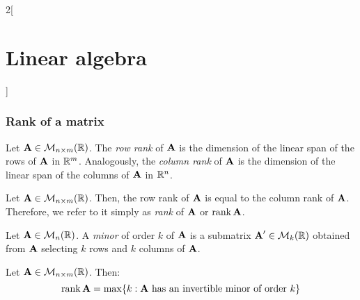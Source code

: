 \documentclass[../../../main_math.tex]{subfiles}
\begin{document}
\begin{multicols}{2}[\section{Linear algebra}]
  \subsubsection{Rank of a matrix}
  \begin{definition}
    Let $\boldsymbol{\mathrm{A}}\in\mathcal{M}_{n\times m}(\mathbb{R})$. The \emph{row rank} of $\boldsymbol{\mathrm{A}}$ is the dimension of the linear span of the rows of $\boldsymbol{\mathrm{A}}$ in $\mathbb{R}^m$. Analogously, the \emph{column rank} of $\boldsymbol{\mathrm{A}}$ is the dimension of the linear span of the columns of $\boldsymbol{\mathrm{A}}$ in $\mathbb{R}^n$.
  \end{definition}
  \begin{proposition}
    Let $\boldsymbol{\mathrm{A}}\in\mathcal{M}_{n\times m}(\mathbb{R})$. Then, the row rank of $\boldsymbol{\mathrm{A}}$ is equal to the column rank of $\boldsymbol{\mathrm{A}}$. Therefore, we refer to it simply as \emph{rank} of $\boldsymbol{\mathrm{A}}$ or $\rank\boldsymbol{\mathrm{A}}$.
  \end{proposition}
  \begin{definition}
    Let $\boldsymbol{\mathrm{A}}\in\mathcal{M}_n(\mathbb{R})$. A \emph{minor} of order $k$ of $\boldsymbol{\mathrm{A}}$ is a submatrix $\boldsymbol{\mathrm{A}}'\in\mathcal{M}_k(\mathbb{R})$ obtained from $\boldsymbol{\mathrm{A}}$ selecting $k$ rows and $k$ columns of $\boldsymbol{\mathrm{A}}$.
  \end{definition}
  \begin{proposition}
    Let $\boldsymbol{\mathrm{A}}\in\mathcal{M}_{n\times m}(\mathbb{R})$. Then:
    $$\rank\boldsymbol{\mathrm{A}}=\max\{k:\text{$\boldsymbol{\mathrm{A}}$\ has an invertible minor of order $k$}\}$$
  \end{proposition}

\end{multicols}
\end{document}
